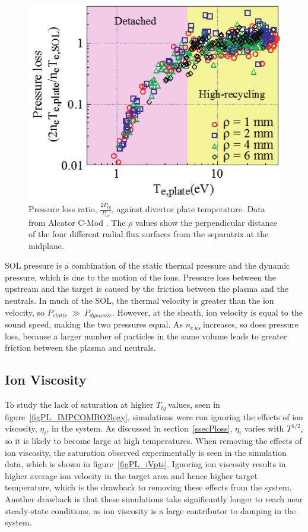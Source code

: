 \documentclass[12pt]{article}  %
\providecommand{\neus}{$n_{e~us}~$} %
\providecommand{\Ttg}{$T_{tg}~$} %
\begin{document}
\begin{figure}
\includegraphics[scale=0.7]{Figures/PlossAlcator.png}
\centering
\caption{Pressure loss ratio, $\frac{2P_{tg}}{P_{us}}$, against divertor plate temperature. Data from Alcator C-Mod \cite{Lipschultz2007}. The $\rho $ values show the perpendicular distance of the four different radial flux surfaces from the separatrix at the midplane.}\label{figPlossAlcator}
\end{figure}

SOL pressure is a combination of the static thermal pressure and the dynamic pressure, which is due to the motion of the ions. Pressure loss between the upstream and the target is caused by the friction between the plasma and the neutrals. In much of the SOL, the thermal velocity is greater than the ion velocity, so $P_{static}~\gg~P_{dynamic}$. However, at the sheath, ion velocity is equal to the sound speed, making the two pressures equal. As \neus increases, so does pressure loss, because a larger number of particles in the same volume leads to greater friction between the plasma and neutrals.


\subsection{Ion Viscosity}\label{ssecIonviscosity}
To study the lack of saturation at higher \Ttg values, seen in figure~\ref{figPL_IMPCOMBO2logy}, simulations were run ignoring the effects of ion viscosity, $\eta_i$, in the system. As discussed in section~\ref{ssecPloss}, $\eta_i$ varies with $T^{5/2}$, so it is likely to become large at high temperatures. When removing the effects of ion viscosity, the saturation observed experimentally is seen in the simulation data, which is shown in figure~\ref{figPL_iVpts}. Ignoring ion viscosity results in higher average ion velocity in the target area and hence higher target temperature, which is the drawback to removing these effects from the system. Another drawback is that these simulations take significantly longer to reach near steady-state conditions, as ion viscosity is a large contributor to damping in the system.
\end{document}
